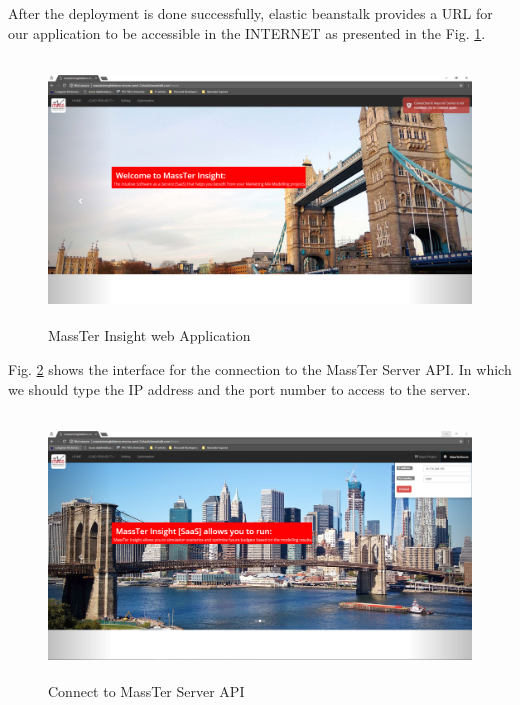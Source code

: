 After the deployment is done successfully, elastic beanstalk provides a URL for our application to be accessible in the INTERNET as presented in the Fig. \ref{MassTerInsightwebApplication}.
\begin{figure}[!b]
	\centering
	\includegraphics[width=17cm,height=7cm]{1.png}
	\caption{MassTer Insight web Application}
	\label{MassTerInsightwebApplication}	
\end{figure} 
\clearpage
\newpage 
Fig. \ref{CMSAscreentshots} shows the interface for the connection to the MassTer Server API. In which we should type the IP address and the port number  to access to the server.
\begin{figure}[!h]
	\centering
	
	\includegraphics[width=17cm,height=7cm]{2.png}
	\caption{Connect to MassTer Server API}
	\label{CMSAscreentshots}
\end{figure}

